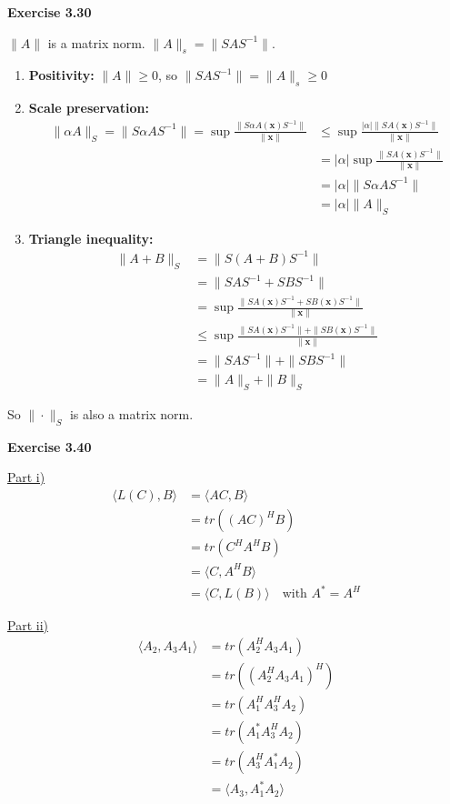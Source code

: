 \documentclass[letterpaper,12pt]{article}
\newcommand{\vect}[1]{\mathbf{#1}}
\begin{document}
\textbf{Exercise 3.30}

$\|A\|$ is a matrix norm. $\|A\|_s = \|SAS^{-1}\|$.
\begin{enumerate}
	\item \textbf{Positivity: } $\|A\| \geq 0 $, so $\|SAS^{-1}\| = \|A\|_s \geq 0$
	\item \textbf{Scale preservation: }
		\begin{align*}
		\|\alpha A\|_S = \|S \alpha AS^{-1}\| = \sup \frac{\| S\alpha A(\vect{x})S^{-1} \|}{\|\vect{x}\|} & \leq \sup \frac{|\alpha| \|SA(\vect{x})S^{-1} \|}{\|\vect{x}\|} \\ &= |\alpha| \sup \frac{\|SA(\vect{x})S^{-1} \|}{\|\vect{x}\|} \\ &= |\alpha| \|S \alpha AS^{-1}\| \\ &= |\alpha| \|A\|_S
		\end{align*}
	\item \textbf{Triangle inequality: }
		\begin{align*}
		\|A + B \|_S &= \|S (A + B) S^{-1}\| \\
		&= \|S A S^{-1} + S B S^{-1}\| \\
		&= \sup \frac{\|S A(\vect{x}) S^{-1} + S B(\vect{x}) S^{-1}\|}{\| \vect{x} \|} \\
		&\leq \sup \frac{\|S A(\vect{x}) S^{-1}\| + \| S B(\vect{x}) S^{-1}\|}{\| \vect{x} \|} \\
		&= \|SAS^{-1}\| + \|SBS^{-1}\| \\
		&= \|A\|_S + \|B\|_S
		\end{align*}
\end{enumerate}

So $\|\cdot\|_S$ is also a matrix norm.

\textbf{Exercise 3.40}

\underline{Part i)}
\begin{align*}
\langle L(C), B \rangle
&= \langle AC, B \rangle \\
&= tr((AC)^HB) \\
&= tr(C^H A^H B) \\
&= \langle C, A^H B \rangle \\
&= \langle C, L(B) \rangle \quad \text{with } A^* = A^H
\end{align*}

\underline{Part ii)}
\begin{align*}
\langle A_2, A_3 A_1 \rangle
&= tr(A_2^H A_3 A_1) \\
&= tr((A_2^H A_3 A_1)^H) \\
&= tr(A_1^HA_3^H A_2) \\
&= tr(A_1^*A_3^H A_2) \\
&= tr(A_3^H A_1^* A_2) \\
&= \langle A_3, A_1^* A_2 \rangle
\end{align*}
\end{document}
